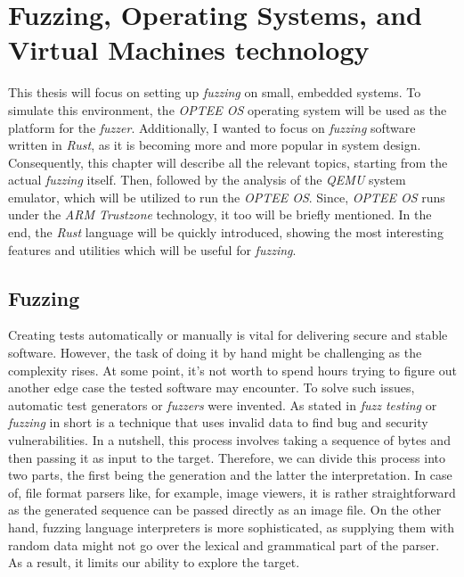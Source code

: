 \cleardoublepage

\section{Fuzzing, Operating Systems, and Virtual Machines technology}

This thesis will focus on setting up \textit{fuzzing} on small, embedded systems. To simulate this environment, the \textit{OPTEE OS} operating system will be used as the platform for the \textit{fuzzer}. Additionally, I wanted to focus on \textit{fuzzing} software written in \textit{Rust}, as it is becoming more and more popular in system design. Consequently, this chapter will describe all the relevant topics, starting from the actual \textit{fuzzing} itself. Then, followed by the analysis of the \textit{QEMU} system emulator, which will be utilized to run the \textit{OPTEE OS}. Since, \textit{OPTEE OS} runs under the \textit{ARM Trustzone} technology, it too will be briefly mentioned. In the end, the \textit{Rust} language will be quickly introduced, showing the most interesting features and utilities which will be useful for \textit{fuzzing}.

\subsection{Fuzzing} \label{chap:theory}

Creating tests automatically or manually is vital for delivering secure and stable software. However, the task of doing it by hand might be challenging as the complexity rises. At some point, it's not worth to spend hours trying to figure out another edge case the tested software may encounter. To solve such issues, automatic test generators or \textit{fuzzers} were invented. As stated in \cite{fuzzing_state_of_art} \textit{fuzz testing} or \textit{fuzzing} in short is a technique that uses invalid data to find bug and security vulnerabilities. In a nutshell, this process involves taking a sequence of bytes and then passing it as input to the target. Therefore, we can divide this process into two parts, the first being the generation and the latter the interpretation. In case of, file format parsers like, for example, image viewers, it is rather straightforward as the generated sequence can be passed directly as an image file. On the other hand, fuzzing language interpreters is more sophisticated, as supplying them with random data might not go over the lexical and grammatical part of the parser. As a result, it limits our ability to explore the target.


